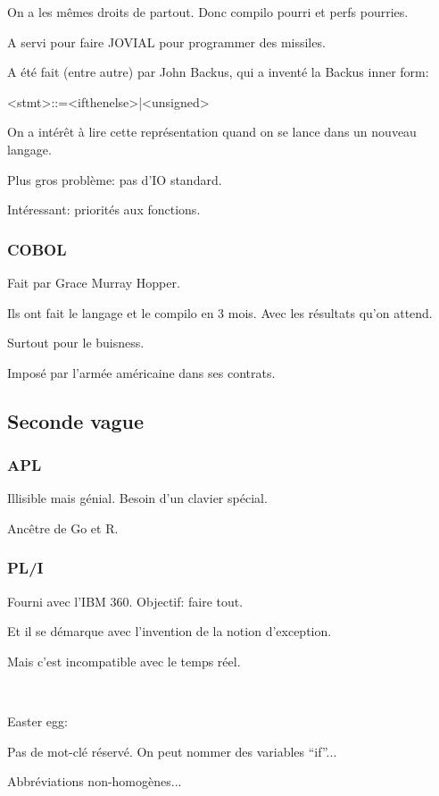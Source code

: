\documentclass[a4paper,11pt]{article}
\begin{document}
On a les mêmes droits de partout. Donc compilo pourri et perfs pourries.

A servi pour faire JOVIAL pour programmer des missiles.

A été fait (entre autre) par John Backus, qui a inventé la Backus inner form:

<stmt>::=<ifthenelse>|<unsigned>

On a intérêt à lire cette représentation quand on se lance dans un nouveau
langage.

Plus gros problème: pas d'IO standard.

Intéressant: priorités aux fonctions.

\subsubsection{COBOL}

Fait par Grace Murray Hopper.

Ils ont fait le langage et le compilo en 3 mois. Avec les résultats qu'on
attend.

Surtout pour le buisness.

Imposé par l'armée américaine dans ses contrats.

\subsection{Seconde vague}

\subsubsection{APL}

Illisible mais génial. Besoin d'un clavier spécial.

Ancêtre de Go et R.

\subsubsection{PL/I}

Fourni avec l'IBM 360. Objectif: faire tout.

Et il se démarque avec l'invention de la notion d'exception.

Mais c'est incompatible avec le temps réel.

\

Easter egg:

Pas de mot-clé réservé. On peut nommer des variables ``if''...

Abbréviations non-homogènes...
\end{document}
